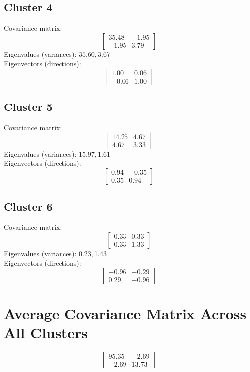 \documentclass{article}
\begin{document}
\subsection*{Cluster 4}
Covariance matrix:
\[\begin{bmatrix}35.48 & -1.95 \\-1.95 & 3.79\end{bmatrix}\]
Eigenvalues (variances): $ 35.60, $3.67\\
Eigenvectors (directions):
\[\begin{bmatrix}1.00 & 0.06 \\-0.06 & 1.00\end{bmatrix}\]
\subsection*{Cluster 5}
Covariance matrix:
\[\begin{bmatrix}14.25 & 4.67 \\4.67 & 3.33\end{bmatrix}\]
Eigenvalues (variances): $ 15.97, $1.61\\
Eigenvectors (directions):
\[\begin{bmatrix}0.94 & -0.35 \\0.35 & 0.94\end{bmatrix}\]
\subsection*{Cluster 6}
Covariance matrix:
\[\begin{bmatrix}0.33 & 0.33 \\0.33 & 1.33\end{bmatrix}\]
Eigenvalues (variances): $ 0.23, $1.43\\
Eigenvectors (directions):
\[\begin{bmatrix}-0.96 & -0.29 \\0.29 & -0.96\end{bmatrix}\]
\section*{Average Covariance Matrix Across All Clusters}
\[\begin{bmatrix}95.35 & -2.69 \\-2.69 & 13.73\end{bmatrix}\]
\end{document}
